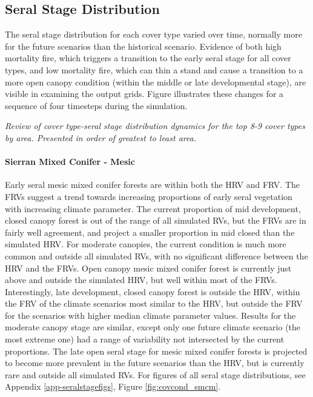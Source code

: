 \documentclass[12pt]{article}
\begin{document}
\begin{spacing}{1}
\subsection*{Seral Stage Distribution}
The seral stage distribution for each cover type varied over time, normally more for the future scenarios than the historical scenario. Evidence of both high mortality fire, which triggers a transition to the early seral stage for all cover types, and low mortality fire, which can thin a stand and cause a transition to a more open canopy condition (within the middle or late developmental stage), are visible in examining the output grids. Figure  illustrates these changes for a sequence of four timesteps during the simulation.

\emph{Review of cover type-seral stage distribution dynamics for the top 8-9 cover types by area. Presented in order of greatest to least area.}


\paragraph{Sierran Mixed Conifer - Mesic} Early seral mesic mixed conifer forests are within both the HRV and FRV. The FRVs suggest a trend towards increasing proportions of early seral vegetation with increasing climate parameter. The current proportion of mid development, closed canopy forest is out of the range of all simulated RVs, but the FRVs are in fairly well agreement, and project a smaller proportion in mid closed than the simulated HRV. For moderate canopies, the current condition is much more common and outside all simulated RVs, with no significant difference between the HRV and the FRVs. Open canopy mesic mixed conifer forest is currently just above and outside the simulated HRV, but well within most of the FRVs. Interestingly, late development, closed canopy forest is outside the HRV, within the FRV of the climate scenarios most similar to the HRV, but outside the FRV for the scenarios with higher median climate parameter values. Results for the moderate canopy stage are similar, except only one future climate scenario (the most extreme one) had a range of variability not intersected by the current proportions. The late open seral stage for mesic mixed conifer forests is projected to become more prevalent in the future scenarios than the HRV, but is currently rare and outside all simulated RVs. For figures of all seral stage distributions, see Appendix \ref{app-seralstagefigs}, Figure \ref{fig:covcond_smcm}.


\end{spacing}
\end{document}
